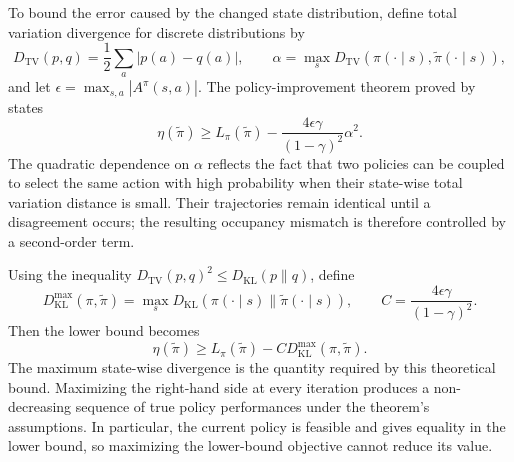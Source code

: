 To bound the error caused by the changed state distribution, define total
variation divergence for discrete distributions by
\begin{equation}
    D_{\mathrm{TV}}(p,q)
    =\frac{1}{2}\sum_a|p(a)-q(a)|,
    \qquad
    \alpha=\max_sD_{\mathrm{TV}}
    (\pi(\cdot\mid s),\widetilde\pi(\cdot\mid s)),
    \label{eq:rl-total-variation}
\end{equation}
and let $\epsilon=\max_{s,a}|A^\pi(s,a)|$. The policy-improvement theorem
proved by \textcite{schulman2015trpo} states
\begin{equation}
    \eta(\widetilde\pi)
    \geq L_\pi(\widetilde\pi)
       -\frac{4\epsilon\gamma}{(1-\gamma)^2}\alpha^2.
    \label{eq:rl-trpo-tv-bound}
\end{equation}
The quadratic dependence on $\alpha$ reflects the fact that two policies can
be coupled to select the same action with high probability when their
state-wise total variation distance is small. Their trajectories remain
identical until a disagreement occurs; the resulting occupancy mismatch is
therefore controlled by a second-order term.

Using the inequality
$D_{\mathrm{TV}}(p,q)^2\leq D_{\mathrm{KL}}(p\|q)$, define
\begin{equation}
    D_{\mathrm{KL}}^{\max}(\pi,\widetilde\pi)
    =\max_sD_{\mathrm{KL}}
      (\pi(\cdot\mid s)\|\widetilde\pi(\cdot\mid s)),
    \qquad
    C=\frac{4\epsilon\gamma}{(1-\gamma)^2}.
    \label{eq:rl-trpo-kl-definitions}
\end{equation}
Then the lower bound becomes
\begin{equation}
    \eta(\widetilde\pi)
    \geq L_\pi(\widetilde\pi)
       -C D_{\mathrm{KL}}^{\max}(\pi,\widetilde\pi).
    \label{eq:rl-trpo-kl-bound}
\end{equation}
The maximum state-wise divergence is the quantity required by this theoretical
bound. Maximizing the right-hand side at every iteration produces a
non-decreasing sequence of true policy performances under the theorem's
assumptions. In particular, the current policy is feasible and gives equality
in the lower bound, so maximizing the lower-bound objective cannot reduce its
value.

